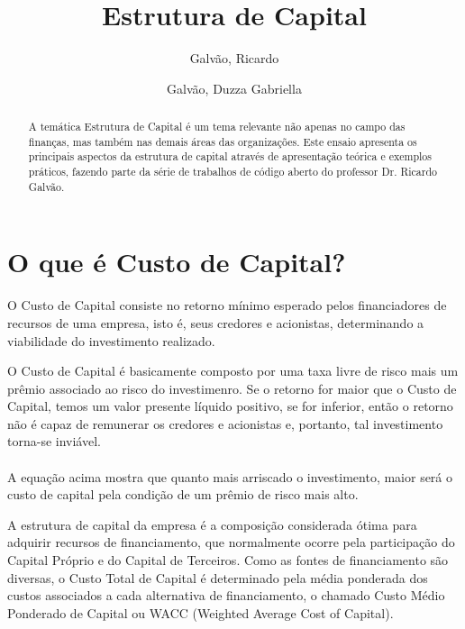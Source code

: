 \documentclass[a4paper,12pt]{article}
\title{Estrutura de Capital}
\author{Galvão, Ricardo\\
\and 
Galvão, Duzza Gabriella}
\begin{document}
\maketitle
\tableofcontents

\newpage

\begin{abstract}

A temática Estrutura de Capital é um tema relevante não apenas no campo das finanças, mas também nas demais áreas das organizações. Este ensaio apresenta os principais aspectos da estrutura de capital através de apresentação teórica e exemplos práticos, fazendo parte da série de trabalhos de código aberto do professor Dr. Ricardo Galvão.

\end{abstract}

\newpage

\section{O que é Custo de Capital?}

O Custo de Capital consiste no retorno mínimo esperado pelos financiadores de recursos de uma empresa, isto é, seus credores e acionistas, determinando a viabilidade do investimento realizado.

O Custo de Capital é basicamente composto por uma taxa livre de risco mais um prêmio associado ao risco do investimenro. Se o retorno for maior que o Custo de Capital, temos um valor presente líquido positivo, se for inferior, então o retorno não é capaz de remunerar os credores e acionistas e, portanto, tal investimento torna-se inviável.\\

\\

A equação acima mostra que quanto mais arriscado o investimento, maior será o custo de capital pela condição de um prêmio de risco mais alto.

A estrutura de capital da empresa é a composição considerada ótima para adquirir recursos de financiamento, que normalmente ocorre pela participação do Capital Próprio e do Capital de Terceiros. Como as fontes de financiamento são diversas, o Custo Total de Capital é determinado pela média ponderada dos custos associados a cada alternativa de financiamento, o chamado Custo Médio Ponderado de Capital ou WACC (Weighted Average Cost of Capital).
\end{document}

